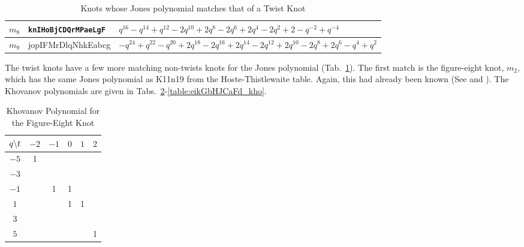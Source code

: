 \documentclass{article}
\theoremstyle{plain}
\begin{document}
\begin{table}[H]
{\begin{tabular}{| l | l | l |}
                    \hline
                        $m_{8}$&
                        \texttt{knIHoBjCDQrMPaeLgF}&
                        $q^{16}-q^{14}+q^{12}-2q^{10}+2q^{8}-2q^{6}+2q^{4}-2q^{2}+2-q^{-2}+q^{-4}$\\
                    \hline
                        $m_{9}$&
                        jopIFMrDlqNhkEabcg&
                        $-q^{24}+q^{22}-q^{20}+2q^{18}-2q^{16}+2q^{14}-2q^{12}+2q^{10}-2q^{8}+2q^{6}-q^{4}+q^{2}$\\
                    \hline
                \end{tabular}%
            }
            \caption{Knots whose Jones polynomial matches that of a Twist Knot}
            \label{table:matching_twist_knots}
        \end{table}
        The twist knots have a few more matching non-twists knots for the
        Jones polynomial
        (Tab.~\ref{table:matching_twist_knots}). The first match is the
        figure-eight knot, $m_{2}$, which has the same Jones polynomial as
        K11n19 from the Hoste-Thistlewaite table.
        Again, this had already been known
        (See \cite{KatlasFigureEight} and \cite{KatlasK11n19}).
        The Khovanov polynomials are
        given in Tabs.~\ref{table:m_2_kho}-\ref{table:eikGbHJCaFd_kho}.
        \begin{table}[H]
            \centering
            \begin{tabular}{| c | c | c | c | c | c |}
                \hline
                $q\symbol{92}t$&$-2$&$-1$&$0$&$1$&$2$\\
                \hline
                $-5$&1&&&&\\
                \hline
                $-3$&&&&&\\
                \hline
                $-1$&&1&1&&\\
                \hline
                $1$&&&1&1&\\
                \hline
                $3$&&&&&\\
                \hline
                $5$&&&&&1\\
                \hline
            \end{tabular}
            \caption{Khovanov Polynomial for the Figure-Eight Knot}
            \label{table:m_2_kho}
        \end{table}
\end{document}
